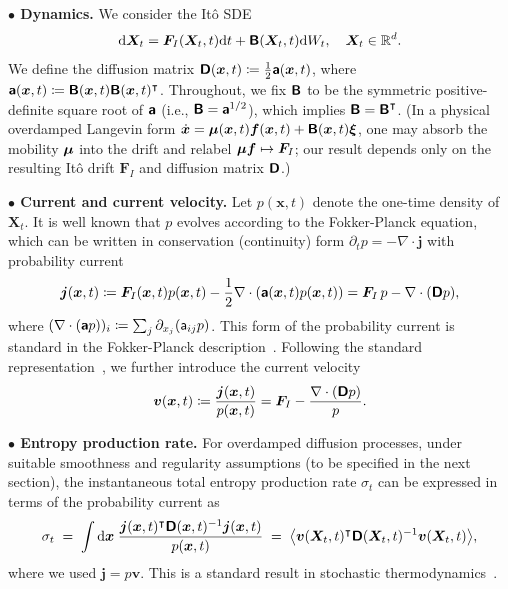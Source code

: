 \bigskip
\noindent\textbf{$\bullet$ Dynamics.} We consider the Itô SDE
\begin{equation}
    \mathrm{d}\bm{X}_t=\bm{F}_I(\bm{X}_t,t)\mathrm{d}t+\boldsymbol{\mathsf{B}}(\bm{X}_t,t)\mathrm{d}W_t,\quad\bm{X}_t\in\mathbb{R}^d.
    \label{seq:dynamics_def}
\end{equation}
We define the diffusion matrix $\boldsymbol{\mathsf{D}}(\bm{x},t)\coloneq\frac{1}{2}\boldsymbol{\mathsf{a}}(\bm{x},t)$,
where $\boldsymbol{\mathsf{a}}(\bm{x},t)\coloneq\boldsymbol{\mathsf{B}}(\bm{x},t)\boldsymbol{\mathsf{B}}(\bm{x},t)^\intercal$. Throughout, we fix $\boldsymbol{\mathsf{B}}$ to be the symmetric positive-definite square root of $\boldsymbol{\mathsf{a}}$ (i.e., $\boldsymbol{\mathsf{B}}=\boldsymbol{\mathsf{a}}^{1/2}$), which implies $\boldsymbol{\mathsf{B}}=\boldsymbol{\mathsf{B}}^\intercal$.
(In a physical overdamped Langevin form $\dot{\bm{x}}=\boldsymbol{\mathsf{\mu}}(\bm{x},t)\bm{f}(\bm{x},t)+\boldsymbol{\mathsf{B}}(\bm{x},t)\bm{\xi}$, one may absorb the mobility $\boldsymbol{\mathsf{\mu}}$ into the drift and relabel $\boldsymbol{\mathsf{\mu}}\bm{f}\mapsto\bm{F}_I$; our result depends only on the resulting It\^{o} drift $\bm{F}_I$ and diffusion matrix $\boldsymbol{\mathsf{D}}$.)

\bigskip
\noindent\textbf{$\bullet$ Current and current velocity.}
Let $p(\bm{x},t)$ denote the one-time density of $\bm{X}_t$. It is well known that $p$ evolves according to the Fokker-Planck equation, which can be written in conservation (continuity) form $\partial_tp=-\nabla\cdot\bm{j}$ with probability current
\begin{equation}
    \bm{j}(\bm{x},t)\coloneq\bm{F}_I(\bm{x},t)p(\bm{x},t)-
    \frac{1}{2}\nabla\cdot(\boldsymbol{\mathsf{a}}(\bm{x},t)p(\bm{x},t))=
    \bm{F}_I\,p-\nabla\cdot(\boldsymbol{\mathsf{D}}p),
    \label{seq:def_j}
\end{equation}
where $(\nabla\cdot(\boldsymbol{\mathsf{a}}p))_i\coloneq\sum_j\partial_{x_j}(\mathsf{a}_{ij}p)$.
This form of the probability current is standard in the Fokker-Planck description~\cite{risken1996fokkerplanck,gardiner2009stochastic}.
Following the standard representation~\cite{nelson1967dynamical, seifert2012stochastic}, we further introduce the current velocity 
\begin{equation}
    \bm{v}(\bm{x},t)\coloneq\frac{\bm{j}(\bm{x},t)}{p(\bm{x},t)}
    =\bm{F}_I-\frac{\nabla\cdot(\boldsymbol{\mathsf{D}}p)}{p}.
    \label{seq:def_v}
\end{equation}

\medskip
\noindent\textbf{$\bullet$ Entropy production rate.}
For overdamped diffusion processes, under suitable smoothness and regularity assumptions (to be specified in the next section), 
the instantaneous total entropy production rate $\sigma_t$ can be expressed in terms of the probability current as
\begin{equation}
    \sigma_t
    \;=\;\int \mathrm{d}\bm{x}\;
    \frac{\bm{j}(\bm{x},t)^\intercal \boldsymbol{\mathsf{D}}(\bm{x},t)^{-1}\bm{j}(\bm{x},t)}{p(\bm{x},t)}
    \;=\;\big\langle \bm{v}(\bm{X}_t,t)^\intercal \boldsymbol{\mathsf{D}}(\bm{X}_t,t)^{-1}\bm{v}(\bm{X}_t,t)\big\rangle,
    \label{seq:ep_rate}
\end{equation}
where we used $\bm{j}=p\bm{v}$. This is a standard result in stochastic thermodynamics~\cite{seifert2012stochastic}.

